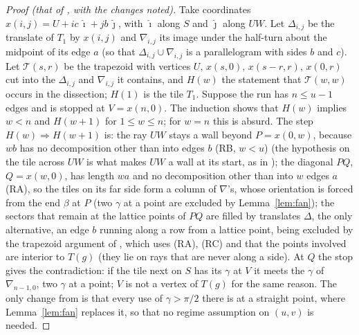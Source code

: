 \documentclass[11pt,reqno]{amsart}
\theoremstyle{plain}
\theoremstyle{definition}
\begin{document}
\begin{proof}[Proof (that of {\cite[Lemmas~32 and~33]{BeesonRosu}}, with the changes noted)]
Take coordinates $x(i,j)=U+ic\,\hat\imath+jb\,\hat\jmath$, with $\hat\imath$ along $S$ and $\hat\jmath$ along $UW$. Let $\Delta_{i,j}$ be
the translate of $T_1$ by $x(i,j)$ and $\nabla_{i,j}$ its image under the half-turn about the midpoint of its edge $a$
(so that $\Delta_{i,j}\cup\nabla_{i,j}$ is a parallelogram with sides $b$ and $c$). Let $\mathcal T(s,r)$ be the trapezoid with
vertices $U,\,x(s,0),\,x(s-r,r),\,x(0,r)$ cut into the $\Delta_{i,j}$ and $\nabla_{i,j}$ it contains, and $H(w)$ the statement that
$\mathcal T(w,w)$ occurs in the dissection; $H(1)$ is the tile $T_1$. Suppose the run has $n\le u-1$ edges and is stopped at $V=x(n,0)$.
The induction shows that $H(w)$ implies $w<n$ and $H(w+1)$ for $1\le w\le n$; for $w=n$ this is absurd. The step $H(w)\Rightarrow H(w+1)$ is:
the ray $UW$ stays a wall beyond $P=x(0,w)$, because $wb$ has no decomposition other than into edges $b$ (RB, $w<u$) (the hypothesis on the tile across $UW$ is what makes $UW$ a wall at its start, as in \cite{BeesonRosu}); the diagonal $PQ$, $Q=x(w,0)$, has length $wa$ and no decomposition other than into $w$ edges $a$ (RA), so the tiles on its far side
form a column of $\nabla$'s, whose orientation is forced from the end $\beta$ at $P$ (two $\gamma$ at a point are excluded by Lemma~\ref{lem:fan}); the sectors that remain at
the lattice points of $PQ$ are filled by translates $\Delta$, the only alternative, an edge $b$ running along a row from a lattice point, being excluded by the trapezoid argument of
\cite[Lemma~32]{BeesonRosu}, which uses (RA), (RC) and that the points involved are interior to $T(g)$ (they lie on rays that are never along a side). At $Q$ the stop gives the contradiction:
if the tile next on $S$ has its $\gamma$ at $V$ it meets the $\gamma$ of $\nabla_{n-1,0}$, two $\gamma$ at a point; $V$ is not a vertex of $T(g)$ for the same reason.
The only change from \cite{BeesonRosu} is that every use of $\gamma>\pi/2$ there is at a straight point, where Lemma~\ref{lem:fan} replaces it, so that no regime assumption on $(u,v)$ is needed.
\end{proof}
\end{document}
